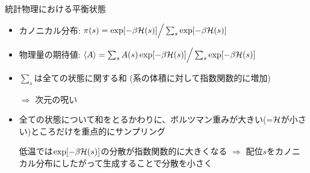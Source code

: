 
\begin{frame}[t,fragile]{統計物理における平衡状態}
  \begin{itemize}
  \item カノニカル分布: $\pi(s) = \exp[-\beta {\cal H}(s)] \Big / \sum_s \exp[-\beta {\cal H}(s)]$
  \item 物理量の期待値: $\langle A \rangle = \sum_s A(s) \exp[-\beta {\cal H}(s)] \Big/ \sum_s \exp[-\beta {\cal H}(s)]$
  \item $\sum_s$は全ての状態に関する和 (系の体積に対して指数関数的に増加)

    $\Rightarrow$ {\color{red}次元の呪い}
    
  \item 全ての状態について和をとるかわりに、ボルツマン重みが大きい(=$\cal H$が小さい)ところだけを重点的にサンプリング

    低温では$\exp[-\beta {\cal H}(s)]$の{\color{red}分散が指数関数的に大きく}なる $\Rightarrow$ 配位$s$をカノニカル分布にしたがって生成することで分散を小さく
  \end{itemize}
\end{frame}
